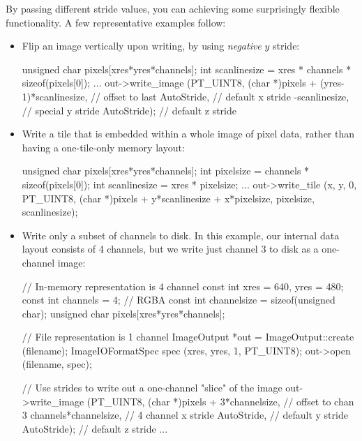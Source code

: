 By passing different stride values, you can achieving some surprisingly
flexible functionality.  A few representative examples follow:

\begin{itemize}
\item Flip an image vertically upon writing, by using \emph{negative}
  $y$ stride:
  \begin{code}
        unsigned char pixels[xres*yres*channels];
        int scanlinesize = xres * channels * sizeof(pixels[0]);
        ...
        out->write_image (PT_UINT8,
                          (char *)pixels + (yres-1)*scanlinesize,  // offset to last
                          AutoStride,                      // default x stride
                          -scanlinesize,                   // special y stride
                          AutoStride);                     // default z stride
  \end{code}
\item Write a tile that is embedded within a whole image of pixel data,
  rather than having a one-tile-only memory layout:
  \begin{code}
        unsigned char pixels[xres*yres*channels];
        int pixelsize = channels * sizeof(pixels[0]);
        int scanlinesize = xres * pixelsize;
        ...
        out->write_tile (x, y, 0, PT_UINT8,
                         (char *)pixels + y*scanlinesize + x*pixelsize,
                         pixelsize,
                         scanlinesize);
  \end{code}
\item Write only a subset of channels to disk.  In this example, our
  internal data layout consists of 4 channels, but we write just 
  channel 3 to disk as a one-channel image:
  \begin{code}
        // In-memory representation is 4 channel
        const int xres = 640, yres = 480;
        const int channels = 4;  // RGBA
        const int channelsize = sizeof(unsigned char);
        unsigned char pixels[xres*yres*channels];

        // File representation is 1 channel
        ImageOutput *out = ImageOutput::create (filename);
        ImageIOFormatSpec spec (xres, yres, 1, PT_UINT8);
        out->open (filename, spec);

        // Use strides to write out a one-channel "slice" of the image
        out->write_image (PT_UINT8,
                          (char *)pixels + 3*channelsize,  // offset to chan 3
                          channels*channelsize,            // 4 channel x stride
                          AutoStride,                      // default y stride
                          AutoStride);                     // default z stride
        ...
  \end{code}
\end{itemize}

